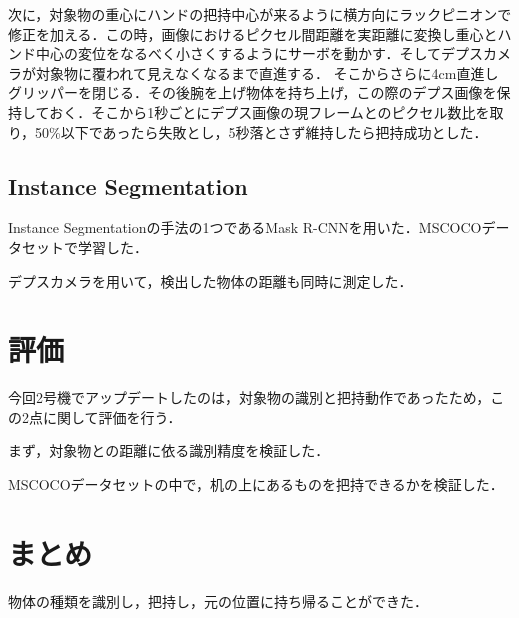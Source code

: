 次に，対象物の重心にハンドの把持中心が来るように横方向にラックピニオンで修正を加える．この時，画像におけるピクセル間距離を実距離に変換し重心とハンド中心の変位をなるべく小さくするようにサーボを動かす．そしてデプスカメラが対象物に覆われて見えなくなるまで直進する．
そこからさらに4cm直進しグリッパーを閉じる．その後腕を上げ物体を持ち上げ，この際のデプス画像を保持しておく．そこから1秒ごとにデプス画像の現フレームとのピクセル数比を取り，50\%以下であったら失敗とし，5秒落とさず維持したら把持成功とした．






\subsection{Instance Segmentation}
Instance Segmentationの手法の1つであるMask R-CNNを用いた．MSCOCOデータセットで学習した．

デプスカメラを用いて，検出した物体の距離も同時に測定した．


\section{評価}
今回2号機でアップデートしたのは，対象物の識別と把持動作であったため，この2点に関して評価を行う．


まず，対象物との距離に依る識別精度を検証した．


MSCOCOデータセットの中で，机の上にあるものを把持できるかを検証した．




\section{まとめ}
物体の種類を識別し，把持し，元の位置に持ち帰ることができた．



